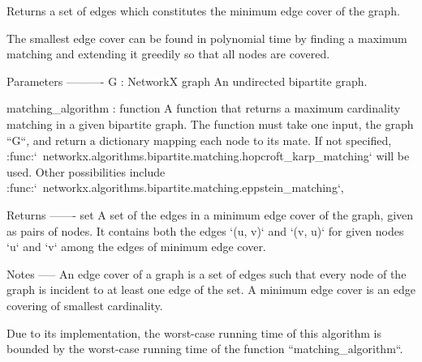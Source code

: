 \begin{DoxyVerb}Returns a set of edges which constitutes
the minimum edge cover of the graph.

The smallest edge cover can be found in polynomial time by finding
a maximum matching and extending it greedily so that all nodes
are covered.

Parameters
----------
G : NetworkX graph
    An undirected bipartite graph.

matching_algorithm : function
    A function that returns a maximum cardinality matching in a
    given bipartite graph. The function must take one input, the
    graph ``G``, and return a dictionary mapping each node to its
    mate. If not specified,
    :func:`~networkx.algorithms.bipartite.matching.hopcroft_karp_matching`
    will be used. Other possibilities include
    :func:`~networkx.algorithms.bipartite.matching.eppstein_matching`,

Returns
-------
set
    A set of the edges in a minimum edge cover of the graph, given as
    pairs of nodes. It contains both the edges `(u, v)` and `(v, u)`
    for given nodes `u` and `v` among the edges of minimum edge cover.

Notes
-----
An edge cover of a graph is a set of edges such that every node of
the graph is incident to at least one edge of the set.
A minimum edge cover is an edge covering of smallest cardinality.

Due to its implementation, the worst-case running time of this algorithm
is bounded by the worst-case running time of the function
``matching_algorithm``.
\end{DoxyVerb}
 